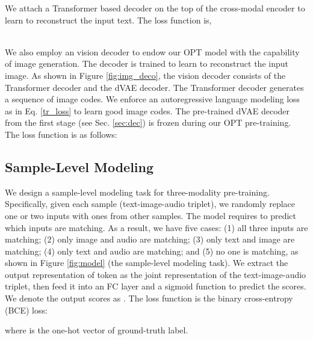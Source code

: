 \documentclass[10pt,twocolumn,letterpaper]{article}
\begin{document}
 We attach a Transformer based decoder \cite{vaswani2017attention} on the top of the cross-modal encoder to learn to reconstruct the input text. The loss function is,
 
\\
 We also employ an vision decoder to endow our OPT model with the capability of image generation. The decoder is trained to learn to reconstruct the input image. As shown in Figure \ref{fig:img_deco}, the vision decoder consists of the Transformer decoder and the dVAE decoder. The Transformer decoder generates a sequence of image codes. We enforce an autoregressive language modeling loss as in Eq. \ref{tr_loss} to learn good image codes. The pre-trained dVAE decoder from the first stage (see Sec. \ref{sec:dec}) is frozen during our OPT pre-training. The loss function is as follows: 

 
\subsection{Sample-Level Modeling}
We design a sample-level modeling task for three-modality pre-training. Specifically, given each sample (\ie text-image-audio triplet), we randomly replace one or two inputs with ones from other samples. The model requires to predict which inputs are matching. As a result, we have five cases: (1) all three inputs are matching; (2) only image and audio are matching; (3) only text and image are matching; (4) only text and audio are matching; and (5) no one is matching, as shown in Figure \ref{fig:model} (the sample-level modeling task). We extract the output representation of  token as the joint representation of the text-image-audio triplet, then feed it into an FC layer and a sigmoid function to predict the scores. We denote the output scores as . The loss function is the binary cross-entropy (BCE) loss:
  
where  is the one-hot vector of ground-truth label.

\begin{table}[!t]
\begin{center}
\caption{Statistics of some common pre-training datasets.}
\label{tab:data}
\end{center}
\end{table}
\end{document}
